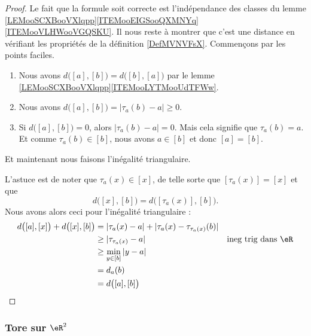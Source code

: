 \begin{proof}
	Le fait que la formule soit correcte est l'indépendance des classes du lemme \ref{LEMooSCXBooVXlqpp}\ref{ITEMooEIGSooQXMNYq}\ref{ITEMooVLHWooVGQSKU}. Il nous reste à montrer que c'est une distance en vérifiant les propriétés de la définition \ref{DefMVNVFsX}. Commençons par les points faciles.
	\begin{enumerate}
		\item
		      Nous avons \( d\big( [a],[b] \big)=d\big( [b],[a] \big)\) par le lemme \ref{LEMooSCXBooVXlqpp}\ref{ITEMooLYTMooUdTFWw}.
		\item
		      Nous avons \( d\big( [a],[b] \big)=| \tau_a(b)-a |\geq 0\).
		\item
		      Si \( d\big( [a],[b] \big)=0\), alors \( | \tau_a(b)-a |=0\). Mais cela signifie que \( \tau_a(b)=a\). Et comme \( \tau_a(b)\in [b]\), nous avons \( a\in [b]\) et donc \( [a]=[b]\).
	\end{enumerate}
	Et maintenant nous faisons l'inégalité triangulaire.

	L'astuce est de noter que \( \tau_a(x)\in[x]\), de telle sorte que \( [\tau_a(x)]=[x]\) et que
	\begin{equation}
		d\big( [x],[b] \big)=d\big( [\tau_a(x)],[b] \big).
	\end{equation}
	Nous avons alors ceci pour l'inégalité triangulaire :
	\begin{subequations}
		\begin{align}
			d\big( [a],[x] \big)+d\big( [x],[b] \big) & =| \tau_a(x)-a |+| \tau_a(x)-\tau_{\tau_a(x)}(b) |                                  \\
			                                          & \geq | \tau_{\tau_a(x)}-a |                        & \text{ineg trig dans \( \eR\)} \\
			                                          & \geq\min_{y\in[b]}| y-a |                                                           \\
			                                          & =d_a(b)                                                                             \\
			                                          & =d\big( [a],[b] \big)
		\end{align}
	\end{subequations}
\end{proof}

\subsubsection{Tore sur \( \eR^2\)}


